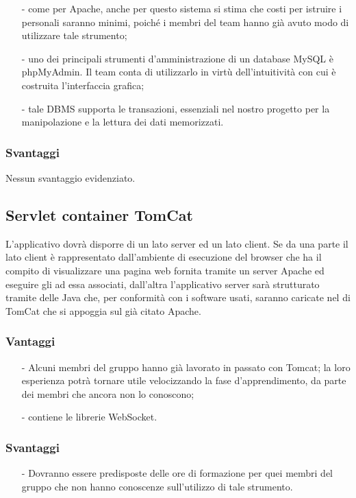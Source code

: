 \begin{itemize}[noitemsep,nolistsep]
  \item[-] come per Apache, anche per questo sistema si stima che costi per istruire i personali saranno minimi, poiché i membri del team hanno già avuto modo di utilizzare tale strumento;
  \item[-] uno dei principali strumenti d'amministrazione di un database MySQL è phpMyAdmin. Il team conta di utilizzarlo in virtù dell'intuitività con cui è costruita l'interfaccia grafica;
  \item[-] tale DBMS supporta le transazioni, essenziali nel nostro progetto per la manipolazione e la lettura dei dati memorizzati.
\end{itemize}

\subsubsection*{Svantaggi}
Nessun svantaggio evidenziato.

\subsection{Servlet container TomCat}

L'applicativo dovrà disporre di un lato server ed un lato client. Se da una parte il lato client è rappresentato dall'ambiente di esecuzione del browser che ha il compito di visualizzare una pagina web fornita tramite un server Apache ed eseguire gli  ad essa associati, dall'altra l'applicativo server sarà strutturato tramite delle  Java che, per conformità con i software usati, saranno caricate nel  di TomCat che si appoggia sul già citato Apache.

\subsubsection*{Vantaggi}

\begin{itemize}[noitemsep,nolistsep]
  \item[-] Alcuni membri del gruppo hanno già lavorato in passato con Tomcat; la loro esperienza potrà tornare utile velocizzando la fase d'apprendimento, da parte dei membri che ancora non lo conoscono;
  \item[-] contiene le librerie WebSocket.
\end{itemize}

\subsubsection*{Svantaggi}
\begin{itemize}[noitemsep,nolistsep]
  \item[-] Dovranno essere predisposte delle ore di formazione per quei membri del gruppo che non hanno conoscenze sull'utilizzo di tale strumento.
\end{itemize}

